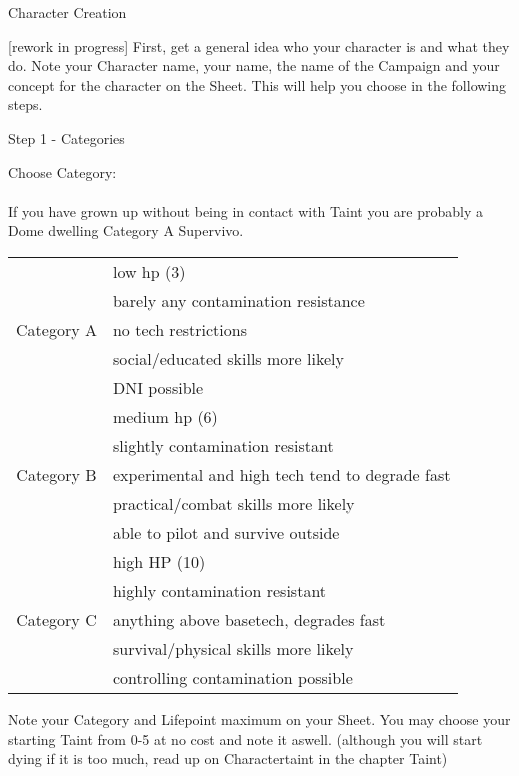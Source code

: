 \documentclass{article}
\newcommand{\headline}[1]{\begin{center}\Large #1 \normalsize \end{center}}
\newcommand{\subhline}[1]{\begin{center}\large #1 \normalsize \end{center}}
\begin{document}
    \headline{Character Creation}
    [rework in progress]
    First, get a general idea who your character is and what they do. Note your Character name, your name, the name of the
    Campaign and your concept for the character on the Sheet. This will help you choose in the following steps.

    \subhline{Step 1 - Categories}

    Choose Category:\\\\
    If you have grown up without being in contact with Taint you are probably a Dome dwelling Category A Supervivo. \\
    \begin{tabular}{c|l}
        & low hp (3)\\
        & barely any contamination resistance\\
        Category A     & no tech restrictions\\
        & social/educated skills more likely\\
        & DNI possible\\\hline
        & medium hp (6)\\
        & slightly contamination resistant\\
        Category B    & experimental and high tech tend to degrade fast\\
        & practical/combat skills more likely\\
        & able to pilot and survive outside\\\hline
        & high HP (10) \\
        & highly contamination resistant \\
        Category C & anything above basetech, degrades fast\\
        & survival/physical skills more likely\\
        & controlling contamination possible
    \end{tabular}\newline


    \par

    Note your Category and Lifepoint maximum on your Sheet. You may choose your starting Taint from 0-5 at no cost and note
    it aswell. (although you will start dying if it is too much, read up on Charactertaint in the chapter Taint)\\
\end{document}
